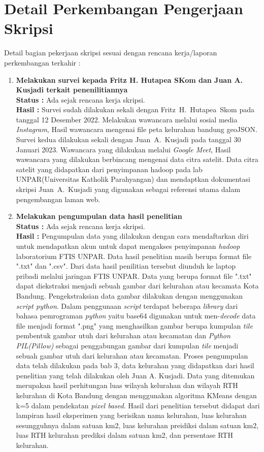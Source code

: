 \documentclass[a4paper,twoside]{article}
\begin{document}
\section{Detail Perkembangan Pengerjaan Skripsi}
Detail bagian pekerjaan skripsi sesuai dengan rencana kerja/laporan perkembangan terkahir :
	\begin{enumerate}
		\item \textbf {Melakukan survei kepada Fritz H. Hutapea SKom dan Juan A. Kusjadi terkait penenilitiannya}\\
		{\bf Status :} Ada sejak rencana kerja skripsi.\\
		{\bf Hasil :} Survei sudah dilakukan sekali dengan Fritz~H.~Hutapea~Skom pada tanggal 12 Desember 2022. Melakukan wawancara melalui sosial media \textit{Instagram}, Hasil wawancara mengenai file peta kelurahan bandung geoJSON. Survei kedua dilakukan sekali dengan Juan~A.~Kusjadi pada tanggal 30 Januari 2023. Wawancara yang dilakukan melalui \textit{Google Meet}, Hasil wawancara yang dilakukan berbincang mengenai data citra satelit. Data citra satelit yang didapatkan dari penyimpanan hadoop pada lab UNPAR(Universitas Katholik Parahyangan) dan mendaptkan dokumentasi skripsi Juan~A.~Kusjadi yang digunakan sebagai referensi utama dalam pengembangan laman web.
		
		\item \textbf{ Melakukan pengumpulan data hasil penelitian}\\
		{\bf Status :} Ada sejak rencana kerja skripsi.\\
		{\bf Hasil :} Pengumpulan data yang dilakukan dengan cara mendaftarkan diri untuk mendapatkan akun untuk dapat mengakses penyimpanan \textit{hadoop} laboratorium FTIS UNPAR. Data hasil penelitian masih berupa format file ".txt" dan ".csv". Dari data hasil penilitian tersebut diunduh ke laptop pribadi melalui jaringan FTIS UNPAR. Data yang berupa format file ".txt" dapat diekstraksi menjadi sebuah gambar dari kelurahan atau kecamata Kota Bandung. Pengekstraksian data gambar dilakukan dengan menggunakan \textit{script python}. Dalam penggunaan \textit{script} terdapat beberapa \textit{library} dari bahasa pemrograman \textit{python} yaitu base64 digunakan untuk men-\textit{decode} data file menjadi format ".png" yang menghasilkan gambar berupa kumpulan \textit{tile} pembentuk gambar utuh dari kelurahan atau kecamatan dan \textit{Python PIL(Pillow)} sebagai penggabungan gambar dari kumpulan \textit{tile} menjadi sebuah gambar utuh dari kelurahan atau kecamatan. Proses pengumpulan data telah dilakukan pada bab 3, data kelurahan yang didapatkan dari hasil penelitian yang telah dilakukan oleh Juan A. Kusjadi. Data yang ditemukan merupakan hasil perhitungan luas wilayah kelurahan dan wilayah RTH kelurahan di Kota Bandung dengan menggunakan algoritma KMeans dengan k=5 dalam pendekatan \textit{pixel based}. Hasil dari penelitian tersebut didapat dari lampiran hasil eksperimen yang berisikan nama kelurahan, luas kelurahan sesungguhnya dalam satuan km2, luas kelurahan preidiksi dalam satuan km2, luas RTH kelurahan prediksi dalam satuan km2, dan persentase RTH kelurahan.
		

\end{enumerate}
\end{document}
